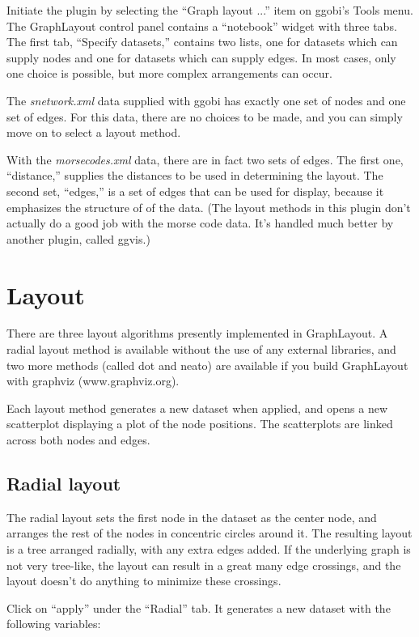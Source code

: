 \documentclass[11pt]{article}
\begin{document}
Initiate the plugin by selecting the ``Graph layout ...'' item on ggobi's
Tools menu.  The GraphLayout control panel contains a ``notebook''
widget with three tabs.  The first tab, ``Specify datasets,'' contains
two lists, one for datasets which can supply nodes and one for datasets
which can supply edges.  In most cases, only one choice is possible,
but more complex arrangements can occur.

The {\em snetwork.xml} data supplied with ggobi has exactly one set of
nodes and one set of edges.  For this data, there are no choices to be
made, and you can simply move on to select a layout method.

With the {\em morsecodes.xml} data, there are in fact two sets of edges.
The first one, ``distance,'' supplies the distances to be used in
determining the layout.  The second set, ``edges,'' is a set of edges
that can be used for display, because it emphasizes the structure of
of the data.  (The layout methods in this plugin don't actually do a
good job with the morse code data.  It's handled much better by another
plugin, called ggvis.)

\section{Layout}

There are three layout algorithms presently implemented in GraphLayout.
A radial layout method is available without the use of any external
libraries, and two more methods (called dot and neato) are available
if you build GraphLayout with graphviz (www.graphviz.org).

Each layout method generates a new dataset when applied, and opens
a new scatterplot displaying a plot of the node positions.  The
scatterplots are linked across both nodes and edges.

\subsection {Radial layout}

The radial layout \cite{Wills99} sets the first node in the dataset
as the center node, and arranges the rest of the nodes in concentric
circles around it.  The resulting layout is a tree arranged radially,
with any extra edges added.
If the underlying graph is not very tree-like, the layout can result
in a great many edge crossings, and the layout doesn't do anything to
minimize these crossings.

Click on ``apply'' under the ``Radial'' tab.  It generates a new
dataset with the following variables:
\end{document}
